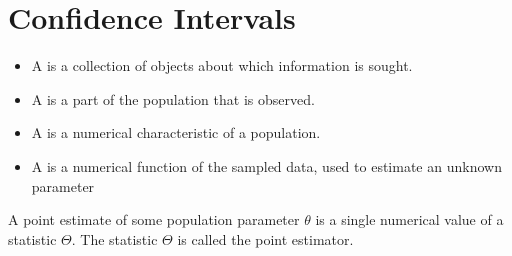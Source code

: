 \chapter{Confidence Intervals}

  \begin{itemize}
    \item A  is a collection of objects about which information is sought.
    \item A  is a part of the population that is observed.
    \item A  is a numerical characteristic of a population.
    \item A  is a numerical function of the sampled data, used to estimate an unknown parameter
  \end{itemize}

  \par A point estimate of some population parameter $\theta$ is a single numerical value of a statistic $\Theta$. The statistic $\Theta$ is called the point estimator.
